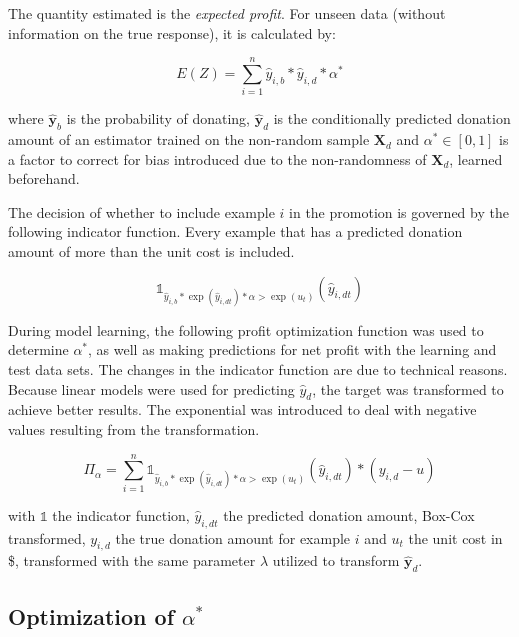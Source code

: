 \documentclass[
  11pt,
  a4paper,
  DIV=12,captions=tableheading,oneside,titlepage=firstiscover,abstracton]{scrreprt}
\begin{document}
The quantity estimated is the \emph{expected profit}. For unseen data (without information on the true response), it is calculated by:

\begin{equation}
E(Z) = \sum_{i=1}^n \hat{y}_{i,b} * \hat{y}_{i,d} *\alpha^*
\label{eq:expected-profit}
\end{equation}

where \(\hat{\mathbf{y}}_b\) is the probability of donating, \(\hat{\mathbf{y}}_d\) is the conditionally predicted donation amount of an estimator trained on the non-random sample \(\mathbf{X}_d\) and \(\alpha^* \in [0,1]\) is a factor to correct for bias introduced due to the non-randomness of \(\mathbf{X}_d\), learned beforehand.

The decision of whether to include example \(i\) in the promotion is governed by the following indicator function. Every example that has a predicted donation amount of more than the unit cost is included.

\begin{equation}
 \mathbb{1}_{\hat{y}_{i,b} * \exp(\hat{y}_{i,dt}) * \alpha > \exp(u_t)}(\hat{y}_{i,dt})
\label{eq:indicator}
\end{equation}

During model learning, the following profit optimization function was used to determine \(\alpha^*\), as well as making predictions for net profit with the learning and test data sets. The changes in the indicator function are due to technical reasons. Because linear models were used for predicting \(\hat{y}_d\), the target was transformed to achieve better results. The exponential was introduced to deal with negative values resulting from the transformation.

\begin{equation}
\Pi_\alpha = \sum_{i=1}^n  \mathbb{1}_{\hat{y}_{i,b} * \exp(\hat{y}_{i,dt}) * \alpha > \exp(u_t)}(\hat{y}_{i,dt})*(y_{i,d} - u)
\label{eq:pi-alpha}
\end{equation}

with \(\mathbb{1}\) the indicator function, \(\hat{y}_{i,dt}\) the predicted donation amount, Box-Cox transformed, \(y_{i,d}\) the true donation amount for example \(i\) and \(u_t\) the unit cost in \$, transformed with the same parameter \(\lambda\) utilized to transform \(\hat{\mathbf{y}}_{d}\).

\hypertarget{optimization-of-alpha}{%
\subsection{\texorpdfstring{Optimization of \(\alpha^*\)}{Optimization of \textbackslash{}alpha\^{}*}}\label{optimization-of-alpha}}
\end{document}
